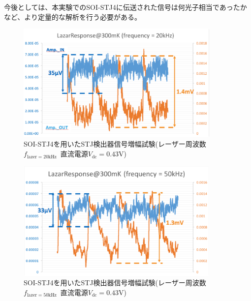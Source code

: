 			今後としては、本実験でのSOI-STJ4に伝送された信号は何光子相当であったかなど、より定量的な解析を行う必要がある。
			\begin{figure}[htbp]
				\begin{center}
					\includegraphics[width=10.0cm]{./Chapter/Chapter4/Picture/STJamp_lazer20k_raw_kakudai.eps}
					\caption{SOI-STJ4を用いたSTJ検出器信号増幅試験(レーザー周波数$f_{\mathrm{lazer}=20\mathrm{kHz}}$\ 直流電源$V_{\mathrm{dc}}=0.43\mathrm{V}$)}
					\label{fig:STJamp_lazer20k_raw_kakudai}
				\end{center}
			\end{figure}
		
			\begin{figure}[htbp]
				\begin{center}
					\includegraphics[width=10.0cm]{./Chapter/Chapter4/Picture/STJamp_lazer50k_raw_kakudai.eps}
					\caption{SOI-STJ4を用いたSTJ検出器信号増幅試験(レーザー周波数$f_{\mathrm{lazer}=50\mathrm{kHz}}$\ 直流電源$V_{\mathrm{dc}}=0.43\mathrm{V}$)}
					\label{fig:STJamp_lazer50k_raw_kakudai}
				\end{center}
			\end{figure}
			
			
	
	
	